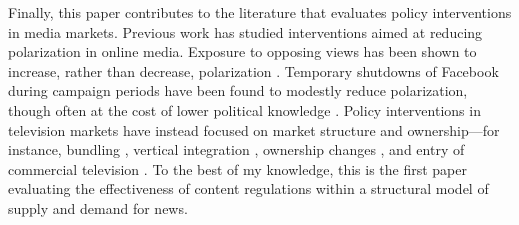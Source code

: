 \documentclass[12pt]{article}
\begin{document}
Finally, this paper contributes to the literature that evaluates policy interventions in media markets. Previous work has studied interventions aimed at reducing polarization in online media. Exposure to opposing views has been shown to increase, rather than decrease, polarization \citep{bail2018exposure}. Temporary shutdowns of Facebook during 
campaign periods have been found to modestly reduce polarization, though often at the cost of lower political knowledge \citep{Allcott2024TheEO}. Policy interventions in television markets have instead focused on market structure and ownership—for instance, bundling \citep{crawford_yurukoglu}, vertical integration \citep{crawford_vertical}, ownership changes \citep{MARTIN_McCRAIN_2019}, and entry of commercial television \citep{prat_stromberg_entry}. To the best of my knowledge, this is the first paper evaluating the effectiveness of content regulations within a structural model of supply and demand for news.
\end{document}

